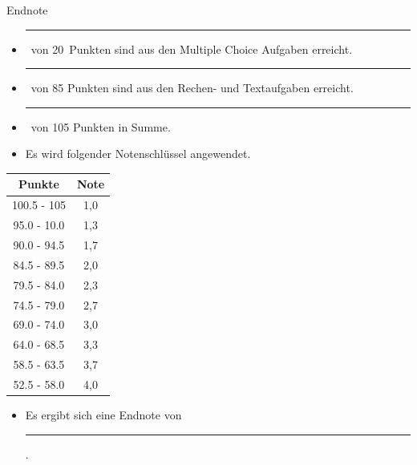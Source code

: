 \documentclass[a4paper, 9pt]{scrartcl}\usepackage[]{graphicx}\usepackage[]{xcolor}
\begin{document}
\begin{graybox}{Endnote}
  \vspace{1Ex}
  \begin{itemize}
  \item[] \rule[0ex]{3em}{.4pt}\, von 20\, Punkten sind aus den Multiple
    Choice Aufgaben erreicht.
  \item[] \rule[0ex]{3em}{.4pt}\, von 85 Punkten sind aus den Rechen- und
    Textaufgaben erreicht. 
  \item[] \rule[0ex]{3em}{.4pt}\, von 105 Punkten in Summe.
  \item[] Es wird folgender Notenschlüssel angewendet.   
  \end{itemize}
  \vspace{1ex}
\begin{center}
  \begin{tabular}[c]{cc}
    \toprule
    \textbf{Punkte}	&	\textbf{Note}	\\
    \midrule
    100.5 - 105	&	1,0	\\
    95.0 - 10.0	&	1,3	\\
    90.0 - 94.5	&	1,7	\\
    84.5 - 89.5	&	2,0	\\
    79.5 - 84.0	&	2,3	\\
    74.5 - 79.0	&	2,7	\\
    69.0 - 74.0	&	3,0	\\
    64.0 - 68.5	&	3,3	\\
    58.5 - 63.5	&	3,7	\\
    52.5 - 58.0	&	4,0	\\
    \bottomrule
  \end{tabular}
\end{center}
  \vspace{1ex}
\begin{itemize}
\item[] Es ergibt sich eine Endnote von \rule[0ex]{4em}{.4pt}.
\end{itemize}
  \vspace{1Ex}
\end{graybox}

\newpage
\end{document}
